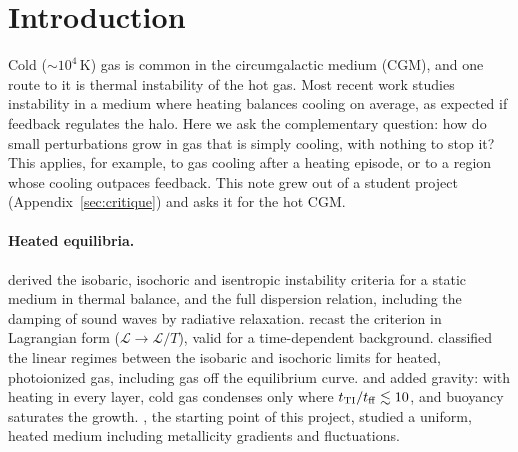 \documentclass[11pt]{article}
\begin{document}
\tableofcontents

\section{Introduction}
\label{sec:prior}

Cold ($\sim10^4$\,K) gas is common in the circumgalactic medium (CGM), and one
route to it is thermal instability of the hot gas. Most recent work studies
instability in a medium where heating balances cooling on average, as expected
if feedback regulates the halo. Here we ask the complementary question: how do
small perturbations grow in gas that is simply cooling, with nothing to stop it?
This applies, for example, to gas cooling after a heating episode, or to a
region whose cooling outpaces feedback. This note grew out of a student project
(Appendix~\ref{sec:critique}) and asks it for the hot CGM.

\paragraph{Heated equilibria.} \citet{field65} derived the isobaric, isochoric and
isentropic instability criteria for a static medium in thermal balance, and the
full dispersion relation, including the damping of sound waves by radiative
relaxation. \citet{balbus86} recast the criterion in Lagrangian form
($\mathcal{L}\to\mathcal{L}/T$), valid for a time-dependent background.
\citet{waters19} classified the linear regimes between the isobaric and isochoric
limits for heated, photoionized gas, including gas off the equilibrium curve.
\citet{mccourt12} and \citet{sharma12} added gravity: with heating in every layer,
cold gas condenses only where $t_{\rm TI}/t_{\rm ff}\lesssim10$, and buoyancy saturates
the growth. \citet{das21}, the starting point of this project, studied a uniform,
heated medium including metallicity gradients and fluctuations.
\end{document}
